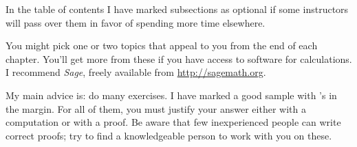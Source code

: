 {%
In the table of contents
I have marked subsections as optional if
some instructors will pass over them in favor of spending more time elsewhere. 

You might pick one or two topics that appeal to you 
from the end of each chapter.
You'll get more from these
if you have access to software for calculations.
I recommend \textit{Sage}, freely available 
from \url{http://sagemath.org}.

My main advice is: do many exercises.
I have marked a good sample with \recommendationmark's in the margin.
For all of them, you must justify your answer either with a computation
or with a proof.
Be aware that few inexperienced people can write correct proofs;
try to find a knowledgeable person to work with you on these.

}
